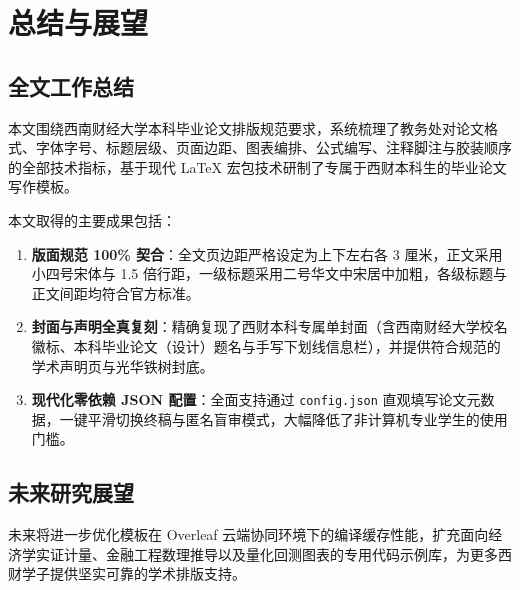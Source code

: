 
\chapter{总结与展望}

\section{全文工作总结}

本文围绕西南财经大学本科毕业论文排版规范要求，系统梳理了教务处对论文格式、字体字号、标题层级、页面边距、图表编排、公式编写、注释脚注与胶装顺序的全部技术指标，基于现代 \LaTeX{} 宏包技术研制了专属于西财本科生的毕业论文写作模板。

本文取得的主要成果包括：
\begin{enumerate}
    \item \textbf{版面规范 100\% 契合}：全文页边距严格设定为上下左右各 3 厘米，正文采用小四号宋体与 1.5 倍行距，一级标题采用二号华文中宋居中加粗，各级标题与正文间距均符合官方标准。
    \item \textbf{封面与声明全真复刻}：精确复现了西财本科专属单封面（含西南财经大学校名徽标、本科毕业论文（设计）题名与手写下划线信息栏），并提供符合规范的学术声明页与光华铁树封底。
    \item \textbf{现代化零依赖 JSON 配置}：全面支持通过 \texttt{config.json} 直观填写论文元数据，一键平滑切换终稿与匿名盲审模式，大幅降低了非计算机专业学生的使用门槛。
\end{enumerate}

\section{未来研究展望}

未来将进一步优化模板在 Overleaf 云端协同环境下的编译缓存性能，扩充面向经济学实证计量、金融工程数理推导以及量化回测图表的专用代码示例库，为更多西财学子提供坚实可靠的学术排版支持。
